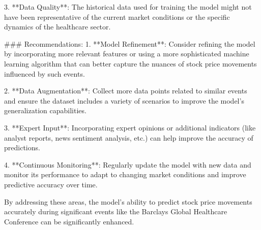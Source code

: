 3. **Data Quality**: The historical data used for training the model might not have been representative of the current market conditions or the specific dynamics of the healthcare sector.

### Recommendations:
1. **Model Refinement**: Consider refining the model by incorporating more relevant features or using a more sophisticated machine learning algorithm that can better capture the nuances of stock price movements influenced by such events.

2. **Data Augmentation**: Collect more data points related to similar events and ensure the dataset includes a variety of scenarios to improve the model's generalization capabilities.

3. **Expert Input**: Incorporating expert opinions or additional indicators (like analyst reports, news sentiment analysis, etc.) can help improve the accuracy of predictions.

4. **Continuous Monitoring**: Regularly update the model with new data and monitor its performance to adapt to changing market conditions and improve predictive accuracy over time.

By addressing these areas, the model's ability to predict stock price movements accurately during significant events like the Barclays Global Healthcare Conference can be significantly enhanced.